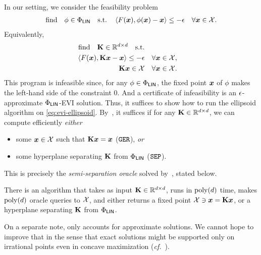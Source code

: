 In our setting, we consider the feasibility problem
\begin{align}\label{eq:evi-ellipsoid}
        \text{find}\quad \phi \in \Philin \qq{s.t.} \ip{F(\vx), \phi(\vx) - \vx} \le -\eps \quad \forall \vx \in \cX.
\end{align}
Equivalently,
\begin{align*}
        \text{find}\quad \mK \in \R^{d \times d} \qq{s.t.} \\\ip{F(\vx), \mK\vx - \vx} \le -\eps \quad &\forall \vx \in \cX, \\\mK \vx \in \cX \quad &\forall \vx \in \cX.
\end{align*}
This program is infeasible since, for any $\phi \in \Phi_\mathsf{LIN}$, the fixed point ${\bm{x}}$ of $\phi$ makes the left-hand side of the constraint $0$. And a certificate of infeasibility is an $\epsilon$-approximate $\Phi_\mathsf{LIN}$-EVI solution. Thus, it suffices to show how to run the ellipsoid algorithm on \eqref{eq:evi-ellipsoid}. By~, it suffices if for any ${\mathbf{K}} \in \mathbb R^{d \times d}$, we can compute efficiently \emph{either}
\begin{itemize}%
        \item some ${\bm{x}} \in {\mathcal{X}}$ such that ${\mathbf{K}}{\bm{x}} = {\bm{x}}$ ($\mathtt{GER}$), {\em or}
        \item some hyperplane separating ${\mathbf{K}}$ from $\Phi_\mathsf{LIN}$ ($\mathtt{SEP}$).
\end{itemize}
This is precisely the \emph{semi-separation oracle} solved by~\citet[Lemma~4.1]{Daskalakis24:Efficient}, stated below.

\begin{lemma}
    \label{lemma:semiseparation}
    There is an algorithm that takes as input $\mathbf{K} \in \mathbb R^{d \times d}$, runs in $\mathrm{poly}(d)$ time, makes $\mathrm{poly}(d)$ oracle queries to ${\mathcal{X}}$, and either returns a fixed point ${\mathcal{X}} \ni {\bm{x}} = \mathbf{K} {\bm{x}}$, or a hyperplane separating $\mathbf{K}$ from $\Phi_\mathsf{LIN}$.
\end{lemma}


On a separate note,  only accounts for approximate solutions. We cannot hope to improve that in the sense that exact solutions might be supported only on irrational points even in concave maximization (\emph{cf.}~).

